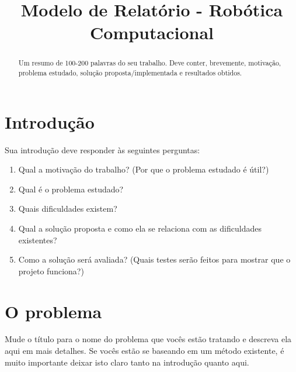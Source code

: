 \documentclass[10pt,conference]{IEEEtran}
\begin{document}
\title{Modelo de Relatório - Robótica Computacional}

\newif\iffinal
\finalfalse
\finaltrue
\newcommand{\jemsid}{99999}

\iffinal
\author{
\and
{}
}

\else
  \author{Sibgrapi paper ID: \jemsid \\ }
\fi


\maketitle

\begin{abstract}
Um resumo de 100-200 palavras do seu trabalho. Deve conter, brevemente, motivação, problema estudado, solução proposta/implementada e resultados obtidos.
\end{abstract}
\IEEEpeerreviewmaketitle

\section{Introdução}

Sua introdução deve responder às seguintes perguntas:

\begin{enumerate}
\item Qual a motivação do trabalho? (Por que o problema estudado é útil?)
\item Qual é o problema estudado?
\item Quais dificuldades existem?
\item Qual a solução proposta e como ela se relaciona com as dificuldades existentes?
\item Como a solução será avaliada? (Quais testes serão feitos para mostrar que o projeto funciona?)
\end{enumerate}

\section{O problema}

Mude o título para o nome do problema que vocês estão tratando e descreva ela aqui em mais detalhes. Se vocês estão se baseando em um método existente, é muito importante deixar isto claro tanto na introdução quanto aqui. 
\end{document}
